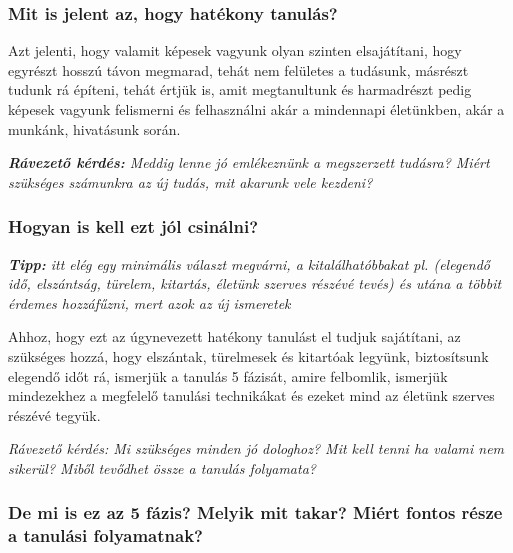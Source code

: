 \documentclass[../Main.tex]{subfiles}
\begin{document}
\subsubsection{Mit is jelent az, hogy hatékony tanulás?}

\begin{flushleft}
    Azt jelenti, hogy valamit képesek vagyunk olyan szinten elsajátítani, hogy egyrészt hosszú távon megmarad,
    tehát nem felületes a tudásunk, másrészt tudunk rá építeni, tehát értjük is,
    amit megtanultunk és harmadrészt pedig képesek vagyunk felismerni és felhasználni akár a mindennapi életünkben,
    akár a munkánk, hivatásunk során.
\end{flushleft}
\textit{\textbf{Rávezető kérdés:} Meddig lenne jó emlékeznünk a megszerzett tudásra? Miért szükséges számunkra az új tudás, mit akarunk vele kezdeni?}

\subsubsection{Hogyan is kell ezt jól csinálni?}
\textit{\textbf{Tipp:} itt elég egy minimális választ megvárni, a kitalálhatóbbakat pl.
 (elegendő idő, elszántság, türelem, kitartás, életünk szerves részévé tevés)
 és utána a többit érdemes hozzáfűzni, mert azok az új ismeretek}

 \begin{flushleft}
    Ahhoz, hogy ezt az úgynevezett hatékony tanulást el tudjuk sajátítani, az szükséges hozzá, hogy elszántak,
    türelmesek és kitartóak legyünk, biztosítsunk elegendő időt rá, ismerjük a tanulás 5 fázisát,
    amire felbomlik, ismerjük mindezekhez a megfelelő tanulási technikákat és ezeket mind az 
    életünk szerves részévé tegyük.
 \end{flushleft}
\textit{\textit{Rávezető kérdés}: Mi szükséges minden jó dologhoz?
 Mit kell tenni ha valami nem sikerül?
 Miből tevődhet össze a tanulás folyamata?}

 \subsubsection{De mi is ez az 5 fázis? \newline Melyik mit takar? \newline Miért fontos része a tanulási folyamatnak?}
\end{document}
